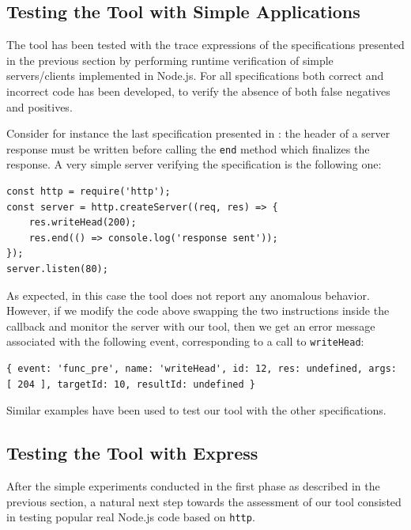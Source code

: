 \subsection{Testing the Tool with Simple Applications}
\label{sec:simple-test}
The tool has been tested with the trace expressions of the specifications presented in the previous section by performing
runtime verification of simple servers/clients implemented in Node.js.
For all specifications both correct and incorrect code has been developed, to verify the absence of both false negatives and positives.

Consider for instance the last specification presented in :
the header of a server response must be written before calling the \lstinline{end} method which finalizes the response.
A very simple server verifying the specification is the following one:
\begin{lstlisting}
const http = require('http');
const server = http.createServer((req, res) => {
	res.writeHead(200);
	res.end(() => console.log('response sent'));
});
server.listen(80);
\end{lstlisting}

As expected, in this case the tool does not report any anomalous behavior.
However, if we modify the code above swapping the two instructions inside the callback
and monitor the server with our tool, then we get an error message associated with the following event, corresponding to a call to \lstinline{writeHead}:
\begin{lstlisting}
{ event: 'func_pre', name: 'writeHead', id: 12, res: undefined, args: [ 204 ], targetId: 10, resultId: undefined }
\end{lstlisting}

Similar examples have been used to test our tool with the other specifications.

\subsection{Testing the Tool with Express}\label{sec:express}

After the simple experiments conducted in the first phase as described in the previous section,
a natural next step towards the assessment of our tool consisted in testing popular real Node.js code
based on \lstinline{http}.

